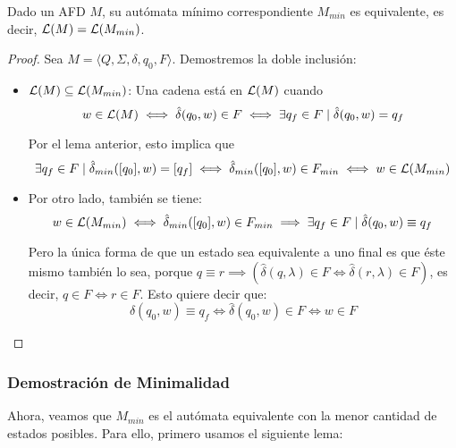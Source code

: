 \begin{theorem*}
    Dado un AFD $M$, su autómata mínimo correspondiente $M_{min}$ es equivalente, es decir, $\mathcal{L}(M) = \mathcal{L}(M_{min})$.
\end{theorem*}
\begin{proof}
    Sea $M = \langle Q, \Sigma, \delta, q_0, F \rangle$. Demostremos la doble inclusión:
    \begin{itemize}
        \item $\mathcal{L}(M) \subseteq \mathcal{L}(M_{min})$: Una cadena está en $\mathcal{L}(M)$ cuando
              $$
                  w \in \mathcal{L}(M) \iff \hat\delta(q_0, w) \in F \iff \exists q_f \in F \mid \hat\delta(q_0, w) = q_f
              $$

              Por el lema anterior, esto implica que
              $$\exists q_f \in F \mid \hat\delta_{min}([q_0], w) = [q_f] \iff \hat\delta_{min}([q_0], w) \in F_{min} \iff w \in \mathcal{L}(M_{min})$$
        \item Por otro lado, también se tiene:
              $$
                  w \in \mathcal{L}(M_{min}) \iff \hat\delta_{min}([q_0], w) \in F_{min} \implies
                  \exists q_f \in F \mid \hat\delta(q_0, w) \equiv q_f
              $$

              Pero la única forma de que un estado sea equivalente a uno final es que éste mismo también lo sea, porque $q \equiv r \implies (\hat\delta(q, \lambda) \in F \iff \hat\delta(r, \lambda) \in F)$, es decir, $q \in F \iff r \in F$. Esto quiere decir que:
              $$
                  \hat\delta(q_0, w) \equiv q_f \iff \hat\delta(q_0, w) \in F \iff w \in F
              $$
    \end{itemize}
\end{proof}

\subsubsection{Demostración de Minimalidad}

Ahora, veamos que $M_{min}$ es el autómata equivalente con la menor cantidad de estados posibles. Para ello, primero usamos el siguiente lema:

